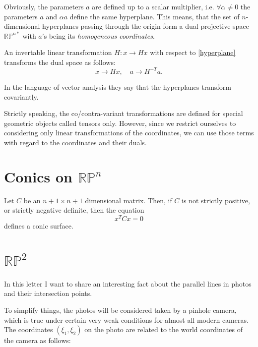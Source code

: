 \documentclass[a4paper,10pt]{article}
\begin{document}
Obviously, the parameters $a$ are defined up to a scalar multiplier, i.e. $\forall\alpha\neq 0$ the parameters $a$ and $\alpha a$ define the same hyperplane. This means, that the set of $n$-dimensional hyperplanes passing through the origin form a dual projective space $\mathbb{RP}^{n*}$ with $a$'s being its {\it homogeneous coordinates}. 

An invertable linear transformation $H: x \to H x$ with respect to \eqref{hyperplane} transforms the dual space as follows:
\begin{equation}
 x\to Hx, \quad a\to H^{-T} a.
\end{equation}

In the language of vector analysis they say that the hyperplanes transform covariantly.

{\tiny Strictly speaking, the co/contra-variant transformations are defined for special geometric objects called tensors only. However, since we restrict ourselves to considering only linear transformations of the coordinates, we can use those terms with regard to the coordinates and their duals. }

\section{Conics on $\mathbb{RP}^n$}

Let $C$ be an $n+1 \times n+1$ dimensional matrix. Then, if $C$ is not strictly positive, or strictly negative definite, then the equation
\begin{equation}
 x^T C x = 0\label{conic}
\end{equation}
defines a conic surface.





\section{$\mathbb{RP}^2$}


In this letter I want to share an interesting fact about the parallel lines in photos and their intersection points.

 To simplify things, the photos will be considered taken by a pinhole camera, which is true under certain very weak conditions for almost all modern cameras. The coordinates $(\xi_1, \xi_2)$  on the photo are related to the world coordinates of the camera as follows:
\end{document}
